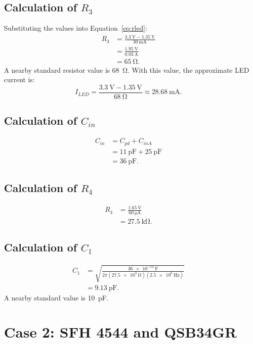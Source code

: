 \documentclass[12pt,a4paper]{article}
\begin{document}
\subsection{Calculation of $R_3$}
Substituting the values into Equation~\eqref{eq:rled}:
\begin{align}
  R_3 &= \frac{\SI{3.3}{\volt}-\SI{1.35}{\volt}}
               {\SI{30}{\milli\ampere}}\\
      &= \frac{\SI{1.95}{\volt}}{\SI{0.03}{\ampere}}\\
      &= \boxed{\SI{65}{\ohm}}.
\end{align}
A nearby standard resistor value is \SI{68}{\ohm}. With this value, the
approximate LED current is:
\begin{equation}
  I_{LED} = \frac{\SI{3.3}{\volt}-\SI{1.35}{\volt}}
                 {\SI{68}{\ohm}}
           \approx \SI{28.68}{\milli\ampere}.
\end{equation}

\subsection{Calculation of $C_{in}$}
\begin{align}
  C_{in} &= C_{pd}+C_{inA}\\
         &= \SI{11}{\pico\farad}+\SI{25}{\pico\farad}\\
         &= \boxed{\SI{36}{\pico\farad}}.
\end{align}

\subsection{Calculation of $R_4$}
\begin{align}
  R_4 &= \frac{\SI{1.65}{\volt}}{\SI{60}{\micro\ampere}}\\
      &= \boxed{\SI{27.5}{\kilo\ohm}}.
\end{align}

\subsection{Calculation of $C_1$}
\begin{align}
 C_1 &=
 \sqrt{\frac{\SI{36e-12}{\farad}}
 {2\pi(\SI{27.5e3}{\ohm})(\SI{2.5e6}{\hertz})}}\\
 &= \boxed{\SI{9.13}{\pico\farad}}.
\end{align}
A nearby standard value is \SI{10}{\pico\farad}.

\section{Case 2: SFH 4544 and QSB34GR}
\end{document}
